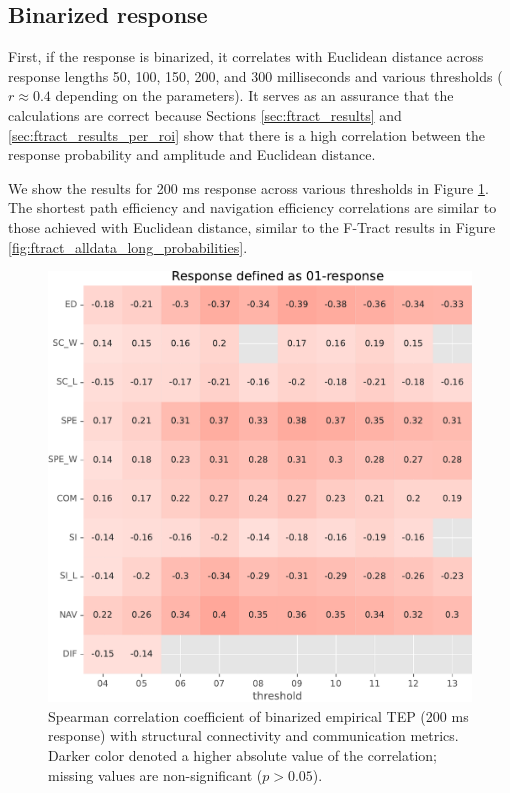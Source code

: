 \subsection{Binarized response}

First, if the response is binarized, it correlates with Euclidean distance across response lengths 50, 100, 150, 200, and 300 milliseconds and various thresholds ($r \approx 0.4$ depending on the parameters). It serves as an assurance that the calculations are correct because Sections \ref{sec:ftract_results} and \ref{sec:ftract_results_per_roi} show that there is a high correlation between the response probability and amplitude and Euclidean distance. 

We show the results for 200 ms response across various thresholds in Figure \ref{fig:tms_01_200}. The shortest path efficiency and navigation efficiency correlations are similar to those achieved with Euclidean distance, similar to the F-Tract results in Figure \ref{fig:ftract_alldata_long_probabilities}.

\begin{figure}
    \centering
    \includegraphics[width=\textwidth]{images/nootebook_generated/tmseeg_results/empirical/200/not_over_threshold_nan/Response defined as 01-response.pdf}
    \caption[Binarized TEP (200 ms) correlations]{Spearman correlation coefficient of binarized empirical TEP (200 ms response) with structural connectivity and communication metrics. Darker color denoted a higher absolute value of the correlation; missing values are non-significant ($p>0.05$).}
    \label{fig:tms_01_200}
\end{figure}

